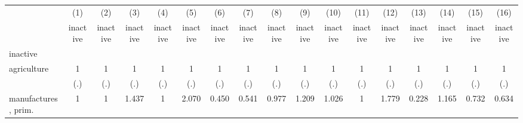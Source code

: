 {
\def\sym#1{\ifmmode^{#1}\else\(^{#1}\)\fi}
\begin{tabular}{l*{16}{c}}
\hline\hline
                    &\multicolumn{1}{c}{(1)}&\multicolumn{1}{c}{(2)}&\multicolumn{1}{c}{(3)}&\multicolumn{1}{c}{(4)}&\multicolumn{1}{c}{(5)}&\multicolumn{1}{c}{(6)}&\multicolumn{1}{c}{(7)}&\multicolumn{1}{c}{(8)}&\multicolumn{1}{c}{(9)}&\multicolumn{1}{c}{(10)}&\multicolumn{1}{c}{(11)}&\multicolumn{1}{c}{(12)}&\multicolumn{1}{c}{(13)}&\multicolumn{1}{c}{(14)}&\multicolumn{1}{c}{(15)}&\multicolumn{1}{c}{(16)}\\
                    &\multicolumn{1}{c}{inactive}&\multicolumn{1}{c}{inactive}&\multicolumn{1}{c}{inactive}&\multicolumn{1}{c}{inactive}&\multicolumn{1}{c}{inactive}&\multicolumn{1}{c}{inactive}&\multicolumn{1}{c}{inactive}&\multicolumn{1}{c}{inactive}&\multicolumn{1}{c}{inactive}&\multicolumn{1}{c}{inactive}&\multicolumn{1}{c}{inactive}&\multicolumn{1}{c}{inactive}&\multicolumn{1}{c}{inactive}&\multicolumn{1}{c}{inactive}&\multicolumn{1}{c}{inactive}&\multicolumn{1}{c}{inactive}\\
\hline
inactive            &                     &                     &                     &                     &                     &                     &                     &                     &                     &                     &                     &                     &                     &                     &                     &                     \\
agriculture         &           1         &           1         &           1         &           1         &           1         &           1         &           1         &           1         &           1         &           1         &           1         &           1         &           1         &           1         &           1         &           1         \\
                    &         (.)         &         (.)         &         (.)         &         (.)         &         (.)         &         (.)         &         (.)         &         (.)         &         (.)         &         (.)         &         (.)         &         (.)         &         (.)         &         (.)         &         (.)         &         (.)         \\
[1em]
manufactures, prim. &           1         &           1         &       1.437         &           1         &       2.070         &       0.450         &       0.541         &       0.977         &       1.209         &       1.026         &           1         &       1.779         &       0.228         &       1.165         &       0.732         &       0.634         \\

\end{tabular}}
